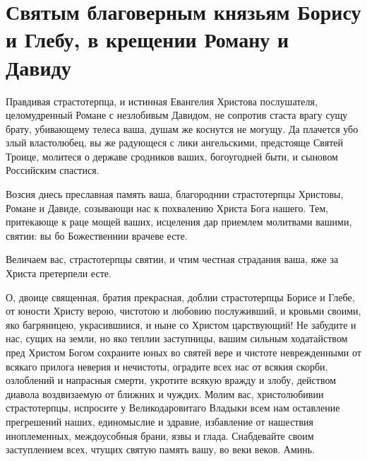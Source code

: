 \section{Святым благоверным князьям Борису и Глебу, в крещении Роману и  Давиду}\begin{mymulticols}
 



Правдивая страстотерпца, и истинная Евангелия Христова послушателя, целомудренный Романе с незлобивым Давидом, не сопротив стаста врагу сущу брату, убивающему телеса ваша, душам же коснутся не могущу. Да плачется убо злый властолюбец, вы же радующеся с лики ангельскими, предстояще Святей Троице, молитеся о державе сродников ваших, богоугодней быти, и сыновом Российским спастися.


Возсия днесь преславная память ваша, благороднии страстотерпцы Христовы, Романе и Давиде, созывающи нас к похвалению Христа Бога нашего. Тем, притекающе к раце мощей ваших, исцеления дар приемлем молитвами вашими, святии: вы бо Божественнии врачеве есте.


Величаем вас, страстотерпцы святии, и чтим честная страдания ваша, яже за Христа претерпели есте.


О, двоице священная, братия прекрасная, доблии страстотерпцы Борисе и Глебе, от юности Христу верою, чистотою и любовию послуживший, и кровьми своими, яко багряницею, украсившиися, и ныне со Христом царствующий! Не забудите и нас, сущих на земли, но яко теплии заступницы, вашим сильным ходатайством пред Христом Богом сохраните юных во святей вере и чистоте неврежденными от всякаго прилога неверия и нечистоты, оградите всех нас от всякия скорби, озлоблений и напрасныя смерти, укротите всякую вражду и злобу, действом диавола воздвизаемую от ближних и чуждих. Молим вас, христолюбивии страстотерпцы, испросите у Великодаровитаго Владыки всем нам оставление прегрешений наших, единомыслие и здравие, избавление от нашествия иноплеменных, междоусобныя брани, язвы и глада. Снабдевайте своим заступлением  всех, чтущих святую память вашу, во веки веков. Аминь.

\end{mymulticols}

